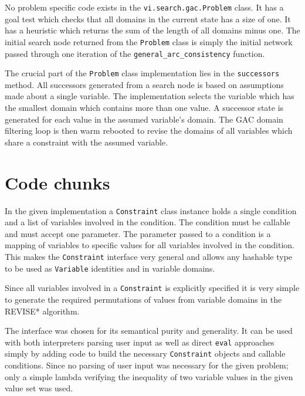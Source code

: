 No problem specific code exists in the \texttt{vi.search.gac.Problem} class. It has a goal test which checks that all domains in the current state has a size of one. It has a heuristic which returns the sum of the length of all domains minus one. The initial search node returned from the \texttt{Problem} class is simply the initial network passed through one iteration of the \texttt{general\_arc\_consistency} function.

The crucial part of the \texttt{Problem} class implementation lies in the \texttt{successors} method. All successors generated from a search node is based on assumptions made about a single variable. The implementation selects the variable which has the smallest domain which contains more than one value. A successor state is generated for each value in the assumed variable's domain. The \ac{GAC} domain filtering loop is then warm rebooted to revise the domains of all variables which share a constraint with the assumed variable.

\section*{Code chunks}

In the given implementation a \texttt{Constraint} class instance holds a single condition and a list of variables involved in the condition. The condition must be callable and must accept one parameter. The parameter passed to a condition is a mapping of variables to specific values for all variables involved in the condition. This makes the \texttt{Constraint} interface very general and allows any hashable type to be used as \texttt{Variable} identities and in variable domains.

Since all variables involved in a \texttt{Constraint} is explicitly specified it is very simple to generate the required permutations of values from variable domains in the \textsc{REVISE*} algorithm.

The interface was chosen for its semantical purity and generality. It can be used with both interpreters parsing user input as well as direct \texttt{eval} approaches simply by adding code to build the necessary \texttt{Constraint} objects and callable conditions. Since no parsing of user input was necessary for the given problem; only a simple lambda verifying the inequality of two variable values in the given value set was used.



